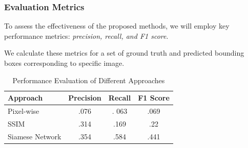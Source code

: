 \documentclass[13.5pt,aspecratio=169, xcolor=dvipsnames]{beamer}
\begin{document}

\begin{frame}
    \onehalfspacing
        \frametitle{ Evaluation Metrics}
       
        \begin{block}{}
            To assess the effectiveness of the proposed methods, we will employ key performance metrics: \textit{precision, recall, and F1 score}. 
        \end{block}

        We calculate these metrics for a set of ground truth and predicted bounding boxes corresponding to specific
        image.

        \begin{table}[htbp]
            \centering
            \caption{Performance Evaluation of Different Approaches}
            \label{tab:performance}
            \begin{tabular}{lccc}
                \toprule
                \textbf{Approach} & \textbf{Precision} & \textbf{Recall} & \textbf{F1 Score} \\
                \midrule
                Pixel-wise & .076 & . 063 & .069 \\
                SSIM & .314 & .169 & .22 \\
                Siamese Network & .354 & .584 & .441 \\
                \bottomrule
            \end{tabular}
        \end{table}
    \end{frame}

\end{document}
